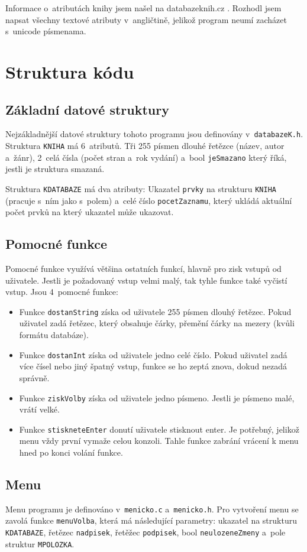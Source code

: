 Informace o~atributách knihy jsem našel na databazeknih.cz \parencite{databazeknih.cz}. Rozhodl jsem napsat všechny 
textové atributy v~angličtině, jelikož program neumí zacházet s~unicode písmenama.

\section{Struktura kódu}
\subsection{Základní datové struktury}
Nejzákladnější datové struktury tohoto programu jsou definovány v~\texttt{databazeK.h}. Struktura 
\texttt{KNIHA} má 6~atributů. Tři 255 písmen dlouhé řetězce (název, autor a~žánr), 2~celá čísla 
(počet stran a~rok vydání) a~bool \texttt{jeSmazano} který říká, jestli je struktura smazaná. 

Struktura \texttt{KDATABAZE} má dva atributy: Ukazatel \texttt{prvky} na strukturu \texttt{KNIHA} (pracuje s~ním jako s~polem) 
a~celé číslo \texttt{pocetZaznamu}, který ukládá aktuální počet prvků na který ukazatel může ukazovat.

\subsection{Pomocné funkce}
Pomocné funkce využívá většina ostatních funkcí, hlavně pro zisk vstupů od uživatele. 
Jestli je požadovaný vstup velmi malý, tak tyhle funkce také vyčistí vstup. Jsou 4~pomocné funkce:
\begin{itemize}
  \item Funkce \texttt{dostanString} získa od uživatele 255 písmen dlouhý řetězec. 
  Pokud uživatel zadá řetězec, který obsahuje čárky, přemění čárky na mezery (kvůli formátu databáze).
  \item Funkce \texttt{dostanInt} získa od uživatele jedno celé číslo. Pokud uživatel zadá více 
  čísel nebo jiný špatný vstup, funkce se ho zeptá znova, dokud nezadá správně. 
  \item Funkce \texttt{ziskVolby} získa od uživatele jedno písmeno. Jestli je písmeno malé, vrátí velké. 
  \item Funkce \texttt{stiskneteEnter} donutí uživatele stisknout enter. Je potřebný, jelikož menu 
  vždy první vymaže celou konzoli. Tahle funkce zabrání vrácení k menu hned po konci volání funkce.
\end{itemize}

\subsection{Menu}
Menu programu je definováno v~\texttt{menicko.c} a~\texttt{menicko.h}. Pro vytvoření menu se zavolá funkce 
\texttt{menuVolba}, která má následující parametry: ukazatel na strukturu \texttt{KDATABAZE}, řetězec \texttt{nadpisek}, 
řetěžec \texttt{podpisek}, bool \texttt{neulozeneZmeny} a~pole struktur \texttt{MPOLOZKA}. 


